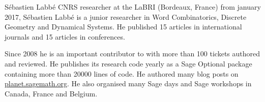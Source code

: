 \begin{participant}[type=R,PM=6,gender=male]{Sébastien Labbé}
CNRS researcher at the LaBRI (Bordeaux, France) from january 2017, Sébastien
Labbé is a junior researcher in Word Combinatorics, Discrete Geometry and
Dynamical Systems. He published 15 articles in international journals and
15 articles in conferences.

Since 2008 he is an important contributor to \Sage with more than 100 tickets
authored and reviewed. He publishes its research code yearly as a Sage Optional
package containing more than 20000 lines of code. He authored many blog posts
on \url{planet.sagemath.org}. He also organised many Sage days and Sage
workshops in Canada, France and Belgium.
\end{participant}

